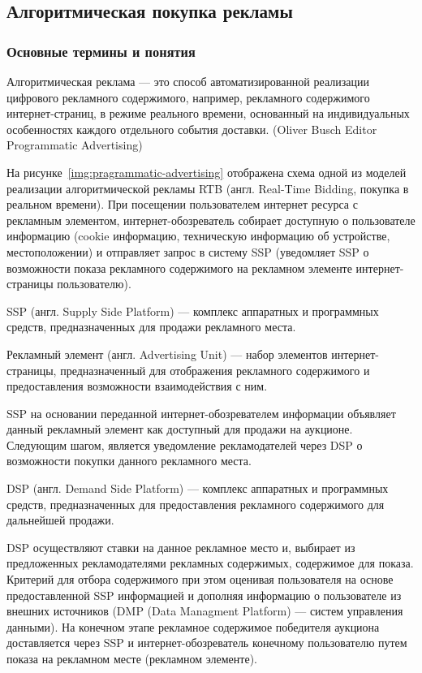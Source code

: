 \subsection{Алгоритмическая покупка рекламы}
\subsubsection{Основные термины и понятия}

Алгоритмическая реклама --- это способ автоматизированной реализации цифрового рекламного содержимого,
например, рекламного содержимого интернет-страниц, в режиме реального времени, основанный на индивидуальных 
особенностях каждого отдельного события доставки. (Oliver Busch Editor Programmatic Advertising)


На рисунке~\ref{img:pragrammatic-advertising} отображена схема одной из моделей реализации алгоритмической рекламы
RTB (англ. Real-Time Bidding, покупка в реальном времени). При посещении пользователем интернет ресурса с рекламным
элементом, интернет-обозреватель собирает доступную о пользователе информацию (cookie информацию, техническую информацию об 
устройстве, местоположении) и отправляет запрос в систему SSP (уведомляет SSP о возможности показа рекламного
содержимого на рекламном элементе интернет-страницы пользователю).

SSP (англ. Supply Side Platform) --- комплекс аппаратных и программных средств, предназначенных для продажи 
рекламного места.

Рекламный элемент (англ. Advertising Unit) --- набор элементов интернет-страницы, предназначенный для 
отображения рекламного содержимого и предоставления возможности взаимодействия с ним.

SSP на основании переданной интернет-обозревателем информации объявляет данный рекламный элемент как доступный для 
продажи на аукционе. Следующим шагом, является уведомление рекламодателей через DSP о возможности покупки
данного рекламного места.

DSP (англ. Demand Side Platform) --- комплекс аппаратных и программных средств, предназначенных для предоставления
рекламного содержимого для дальнейшей продажи.

DSP осуществляют ставки на данное рекламное место и, выбирает из предложенных рекламодателями рекламных содержимых,
содержимое для показа. Критерий для отбора содержимого  при этом оценивая пользователя на основе предоставленной
SSP информацией и дополняя информацию о пользователе из внешних источников (DMP (Data Managment Platform) --- 
систем управления данными). На конечном этапе рекламное содержимое победителя аукциона доставляется через SSP и
интернет-обозреватель конечному пользователю путем показа на рекламном месте (рекламном элементе).

